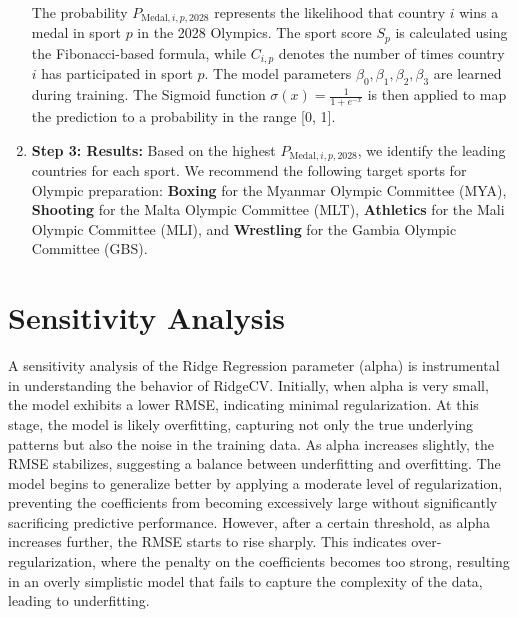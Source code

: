 \documentclass[12pt]{article}  %
\begin{document}
\begin{enumerate}[\textbullet]
    The probability $P_{\text{Medal}, i, p, 2028}$ represents the likelihood that country $i$ wins a medal in sport $p$ in the 2028 Olympics. The sport score $S_p$ is calculated using the Fibonacci-based formula, while $C_{i,p}$ denotes the number of times country $i$ has participated in sport $p$. The model parameters $\beta_0,\beta_1,\beta_2,\beta_3$ are learned during training. The Sigmoid function $\sigma(x) = \frac{1}{1 + e^{-x}}$ is then applied to map the prediction to a probability in the range [0, 1].

    \item \textbf{Step 3: Results: }Based on the highest $P_{\text{Medal}, i, p, 2028}$, we identify the leading countries for each sport. We recommend the following target sports for Olympic preparation: \textbf{Boxing} for the Myanmar Olympic Committee (MYA), \textbf{Shooting} for the Malta Olympic Committee (MLT), \textbf{Athletics} for the Mali Olympic Committee (MLI), and \textbf{Wrestling} for the Gambia Olympic Committee (GBS).

    
\end{enumerate}






\section{Sensitivity Analysis}
A sensitivity analysis of the Ridge Regression parameter (alpha) is instrumental in understanding the behavior of RidgeCV. Initially, when alpha is very small, the model exhibits a lower RMSE, indicating minimal regularization. At this stage, the model is likely overfitting, capturing not only the true underlying patterns but also the noise in the training data. As alpha increases slightly, the RMSE stabilizes, suggesting a balance between underfitting and overfitting. The model begins to generalize better by applying a moderate level of regularization, preventing the coefficients from becoming excessively large without significantly sacrificing predictive performance. However, after a certain threshold, as alpha increases further, the RMSE starts to rise sharply. This indicates over-regularization, where the penalty on the coefficients becomes too strong, resulting in an overly simplistic model that fails to capture the complexity of the data, leading to underfitting.
\end{document}
